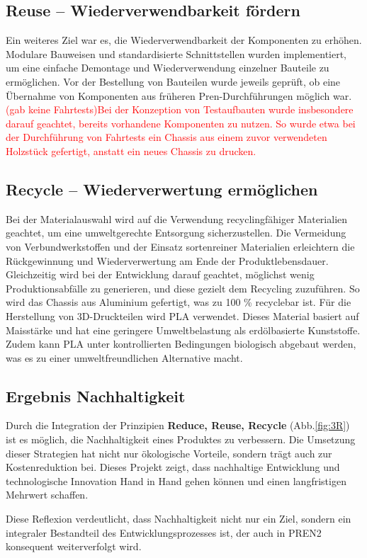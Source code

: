 \documentclass[../main.tex]{subfiles}
\begin{document}
\subsection{Reuse – Wiederverwendbarkeit fördern}

Ein weiteres Ziel war es, die Wiederverwendbarkeit der Komponenten zu erhöhen. Modulare Bauweisen und standardisierte Schnittstellen wurden implementiert, um eine einfache Demontage und Wiederverwendung einzelner Bauteile zu ermöglichen. Vor der Bestellung von Bauteilen wurde jeweils geprüft, ob eine Übernahme von Komponenten aus früheren Pren-Durchführungen möglich war. \textcolor{Red}{(gab keine Fahrtests)Bei der Konzeption von Testaufbauten wurde insbesondere darauf geachtet, bereits vorhandene Komponenten zu nutzen. So wurde etwa bei der Durchführung von Fahrtests ein Chassis aus einem zuvor verwendeten Holzstück gefertigt, anstatt ein neues Chassis zu drucken.}

\subsection{Recycle – Wiederverwertung ermöglichen}

Bei der Materialauswahl wird auf die Verwendung recyclingfähiger Materialien geachtet, um eine umweltgerechte Entsorgung sicherzustellen. Die Vermeidung von Verbundwerkstoffen und der Einsatz sortenreiner Materialien erleichtern die Rückgewinnung und Wiederverwertung am Ende der Produktlebensdauer. Gleichzeitig wird bei der Entwicklung darauf geachtet, möglichst wenig Produktionsabfälle zu generieren, und diese gezielt dem Recycling zuzuführen. So wird das Chassis aus Aluminium gefertigt, was zu 100 \% recyclebar ist. Für die Herstellung von 3D-Druckteilen wird \gls{PLA} verwendet. Dieses Material basiert auf Maisstärke und hat eine geringere Umweltbelastung als erdölbasierte Kunststoffe. Zudem kann PLA unter kontrollierten Bedingungen biologisch abgebaut werden, was es zu einer umweltfreundlichen Alternative macht.

\subsection{Ergebnis Nachhaltigkeit}

Durch die Integration der Prinzipien \textbf{Reduce, Reuse, Recycle} (Abb.\ref{fig:3R}) ist es möglich, die Nachhaltigkeit eines Produktes zu verbessern. Die Umsetzung dieser Strategien hat nicht nur ökologische Vorteile, sondern trägt auch zur Kostenreduktion bei. Dieses Projekt zeigt, dass nachhaltige Entwicklung und technologische Innovation Hand in Hand gehen können und einen langfristigen Mehrwert schaffen.

Diese Reflexion verdeutlicht, dass Nachhaltigkeit nicht nur ein Ziel, sondern ein integraler Bestandteil des Entwicklungsprozesses ist, der auch in PREN2 konsequent weiterverfolgt wird.
\end{document}
